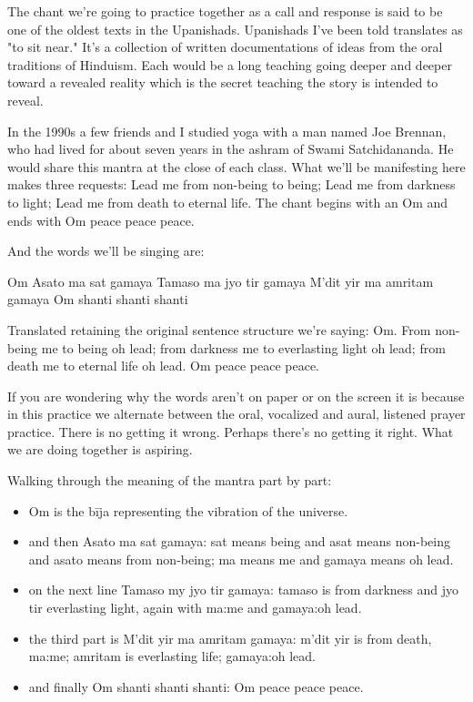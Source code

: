 \documentclass[12pt]{article}
\begin{document}
The chant we're going to practice together as a call and response is said to be one of the oldest texts in the Upanishads. Upanishads I've been told translates as "to sit near." It's a collection of written documentations of ideas from the oral traditions of Hinduism. Each would be a long teaching going deeper and deeper toward a revealed reality which is the secret teaching the story is intended to reveal.

In the 1990s a few friends and I studied yoga with a man named Joe Brennan, who had lived for about seven years in the ashram of Swami Satchidananda. He would share this mantra at the close of each class. What we'll be manifesting here makes three requests: Lead me from non-being to being; Lead me from darkness to light; Lead me from death to eternal life. The chant begins with an Om and ends with Om peace peace peace.

And the words we'll be singing are:

Om Asato ma sat gamaya
Tamaso ma jyo tir gamaya
M'dit yir ma amritam gamaya
Om shanti shanti shanti

Translated retaining the original sentence structure we're saying: Om. From non-being me to being oh lead; from darkness me to everlasting light oh lead; from death me to eternal life oh lead. Om peace peace peace.

If you are wondering why the words aren't on paper or on the screen it is because in this practice we alternate between the oral, vocalized and aural, listened prayer practice. There is no getting it wrong. Perhaps there's no getting it right. What we are doing together is aspiring.

Walking through the meaning of the mantra part by part:

\begin{itemize}
  \item Om is the bīja representing the vibration of the universe.
  \item and then Asato ma sat gamaya: sat means being and asat means non-being and asato means from non-being; ma means me and gamaya means oh lead.
  \item on the next line Tamaso my jyo tir gamaya: tamaso is from darkness and jyo tir everlasting light, again with ma:me and gamaya:oh lead.
  \item the third part is M'dit yir ma amritam gamaya: m'dit yir is from death, ma:me; amritam is everlasting life; gamaya:oh lead.
  \item and finally Om shanti shanti shanti: Om peace peace peace.
\end{itemize}
\end{document}
